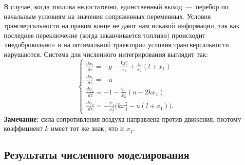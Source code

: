 \documentclass[12pt, a4paper]{article} %
\begin{document}
В случае, когда топлива недостаточно, единственный выход~---~перебор 
по начальным условиям на значения сопряженных переменных. 
Условия трансверсальности на правом конце не дают нам никакой информации,
так как последнее переключение (когда заканчивается топливо) происходит
«недобровольно» и на оптимальной траектории условия трансверсальности нарушаются. 
Система для численного интегрирования выглядит так:
\begin{equation}\label{eq:1_inv_time}
\begin{cases}
    \displaystyle
    \frac{dx_1}{d\tau} = -g - \frac{kx_1^2}{x_2}
        + \frac{u}{x_2}\left(l + x_1\right) \\
    \displaystyle
    \frac{dx_2}{d\tau} = -u \\
    \displaystyle
    \frac{d\psi_1}{d\tau} = -1 - \frac{\psi_1}{x_2} \left(u - 2kx_1\right) \\
    \displaystyle
    \frac{d\psi_2}{d\tau} = -\frac{\psi_1}{x_2^2} \bigl(kx_1^2 - u(l + x_1)\bigr).
\end{cases} 
\end{equation} 
\textbf{Замечание:} сила сопротивления воздуха направлена против движения,
поэтому коэффициент $k$ имеет тот же знак, что и  $x_1$.

\subsection{Результаты численного моделирования}
\end{document}
